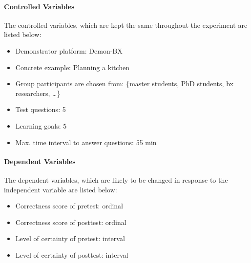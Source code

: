 \paragraph{Controlled Variables} The controlled variables, which are kept the same throughout the experiment are listed below:

\begin{itemize}
	\item Demonstrator platform: Demon-BX
	\item Concrete example: Planning a kitchen
	\item Group participants are chosen from: \{master students, PhD students, bx researchers, \ldots \}
	\item Test questions: 5
	\item Learning goals: 5
	\item Max. time interval to answer questions: 55 min
\end{itemize}

\paragraph{Dependent Variables} The dependent variables, which are likely to be changed in response to the independent variable are listed below:

\begin{itemize}
  \item Correctness score of pretest: ordinal
  \item Correctness score of posttest: ordinal
  \item Level of certainty of pretest:  interval
  \item Level of certainty of posttest: interval
\end{itemize}

